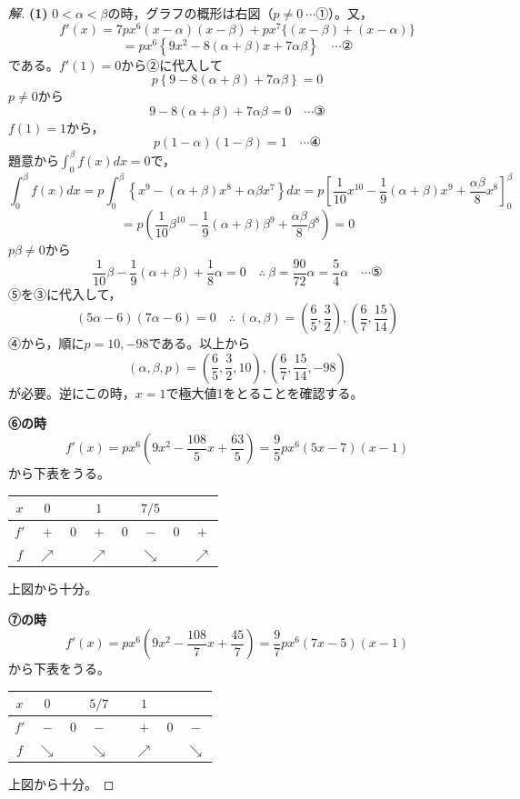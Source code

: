 \documentclass[../main.tex]{subfiles}
\begin{document}
\begin{proof}[解]
  \textbf{(1)} $0<\alpha<\beta$の時，グラフの概形は右図（$p\ne0\ \cdots$①）。又，
  \[
    f'(x)=7px^6(x-\alpha)(x-\beta)+px^7\{(x-\beta)+(x-\alpha)\}
  \]
  \[
    =px^6\left\{9x^2-8(\alpha+\beta)x+7\alpha\beta\right\} \quad\cdots\text{②}
  \]
  である。$f'(1)=0$から②に代入して
  \[
    p\left\{9-8(\alpha+\beta)+7\alpha\beta\right\}=0
  \]
  $p\ne0$から
  \[
    9-8(\alpha+\beta)+7\alpha\beta=0 \quad\cdots\text{③}
  \]
  $f(1)=1$から，
  \[
    p(1-\alpha)(1-\beta)=1 \quad\cdots\text{④}
  \]
  題意から$\displaystyle\int_0^\beta f(x)dx=0$で，
  \[
    \int_0^\beta f(x)dx=p\int_0^\beta\left\{x^9-(\alpha+\beta)x^8+\alpha\beta x^7\right\}dx=p\left[\frac1{10}x^{10}-\frac19(\alpha+\beta)x^9+\frac{\alpha\beta}{8}x^8\right]_0^\beta
  \]
  \[
    =p\left(\frac1{10}\beta^{10}-\frac19(\alpha+\beta)\beta^9+\frac{\alpha\beta}{8}\beta^8\right)=0
  \]
  $p\beta\ne0$から
  \[
    \frac1{10}\beta-\frac19(\alpha+\beta)+\frac18\alpha=0 \quad\therefore\ \beta=\frac{90}{72}\alpha=\frac54\alpha \quad\cdots\text{⑤}
  \]
  ⑤を③に代入して，
  \[
    (5\alpha-6)(7\alpha-6)=0 \quad\therefore\ (\alpha,\beta)=\left(\frac65,\frac32\right),\left(\frac67,\frac{15}{14}\right)
  \]
  ④から，順に$p=10,-98$である。以上から
  \[
    (\alpha,\beta,p)=\left(\frac65,\frac32,10\right),\left(\frac67,\frac{15}{14},-98\right)
  \]
  が必要。逆にこの時，$x=1$で極大値1をとることを確認する。

  \textbf{⑥の時}
  \[
    f'(x)=px^6\left(9x^2-\frac{108}{5}x+\frac{63}{5}\right)=\frac95px^6(5x-7)(x-1)
  \]
  から下表をうる。
  \begin{center}
    \begin{tabular}{c|ccccccc}
      $x$ & $0$ & & $1$ & & $7/5$ & & \\
      \hline
      $f'$ & $+$ & $0$ & $+$ & $0$ & $-$ & $0$ & $+$ \\
      \hline
      $f$ & $\nearrow$ & & $\nearrow$ & & $\searrow$ & & $\nearrow$
    \end{tabular}
  \end{center}
  上図から十分。

  \textbf{⑦の時}
  \[
    f'(x)=px^6\left(9x^2-\frac{108}7x+\frac{45}7\right)=\frac97px^6(7x-5)(x-1)
  \]
  から下表をうる。
  \begin{center}
    \begin{tabular}{c|ccccccc}
      $x$ & $0$ & & $5/7$ & & $1$ & & \\
      \hline
      $f'$ & $-$ & $0$ & $-$ & & $+$ & $0$ & $-$ \\
      \hline
      $f$ & $\searrow$ & & $\searrow$ & & $\nearrow$ & & $\searrow$
    \end{tabular}
  \end{center}
  上図から十分。


\end{proof}
\end{document}
